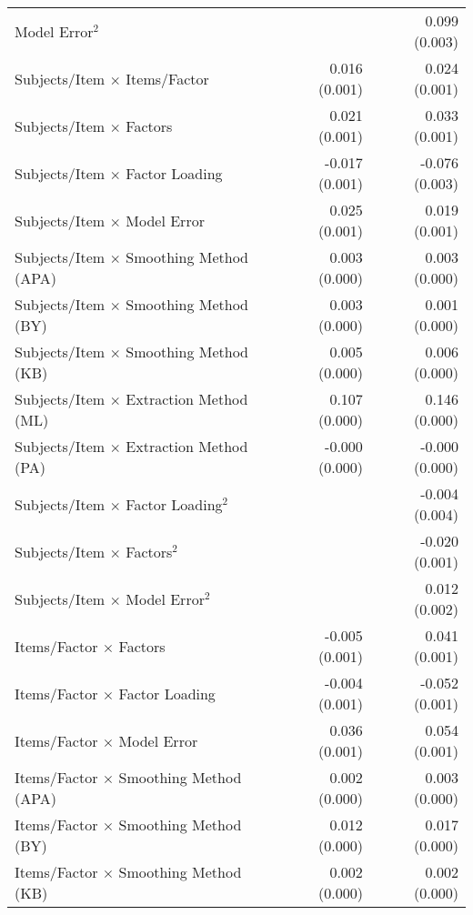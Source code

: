 \documentclass[
  english,
  man]{apa6}
\begin{document}
\begin{center}
\begin{longtable}{l D{)}{)}{11)0} D{)}{)}{11)0}}
Model Error$^2$                                        &                   & 0.099 \; (0.003)  \\
Subjects/Item $\times$ Items/Factor                    & 0.016 \; (0.001)  & 0.024 \; (0.001)  \\
Subjects/Item $\times$ Factors                         & 0.021 \; (0.001)  & 0.033 \; (0.001)  \\
Subjects/Item $\times$ Factor Loading                  & -0.017 \; (0.001) & -0.076 \; (0.003) \\
Subjects/Item $\times$ Model Error                     & 0.025 \; (0.001)  & 0.019 \; (0.001)  \\
Subjects/Item $\times$ Smoothing Method (APA)          & 0.003 \; (0.000)  & 0.003 \; (0.000)  \\
Subjects/Item $\times$ Smoothing Method (BY)           & 0.003 \; (0.000)  & 0.001 \; (0.000)  \\
Subjects/Item $\times$ Smoothing Method (KB)           & 0.005 \; (0.000)  & 0.006 \; (0.000)  \\
Subjects/Item $\times$ Extraction Method (ML)          & 0.107 \; (0.000)  & 0.146 \; (0.000)  \\
Subjects/Item $\times$ Extraction Method (PA)          & -0.000 \; (0.000) & -0.000 \; (0.000) \\
Subjects/Item $\times$ Factor Loading$^2$              &                   & -0.004 \; (0.004) \\
Subjects/Item $\times$ Factors$^2$                     &                   & -0.020 \; (0.001) \\
Subjects/Item $\times$ Model Error$^2$                 &                   & 0.012 \; (0.002)  \\
Items/Factor $\times$ Factors                          & -0.005 \; (0.001) & 0.041 \; (0.001)  \\
Items/Factor $\times$ Factor Loading                   & -0.004 \; (0.001) & -0.052 \; (0.001) \\
Items/Factor $\times$ Model Error                      & 0.036 \; (0.001)  & 0.054 \; (0.001)  \\
Items/Factor $\times$ Smoothing Method (APA)           & 0.002 \; (0.000)  & 0.003 \; (0.000)  \\
Items/Factor $\times$ Smoothing Method (BY)            & 0.012 \; (0.000)  & 0.017 \; (0.000)  \\
Items/Factor $\times$ Smoothing Method (KB)            & 0.002 \; (0.000)  & 0.002 \; (0.000)  \\

\end{longtable}
\end{center}
\end{document}
